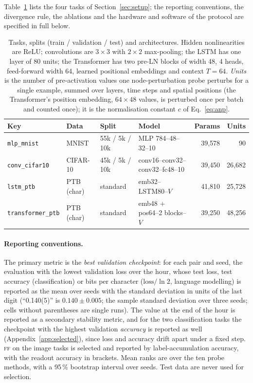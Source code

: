 \documentclass{article}
\newcommand{\method}[1]{\textsc{#1}}
\newcommand{\FF}{\method{ff}}
\begin{document}
Table~\ref{tab:tasks} lists the four tasks of Section~\ref{sec:setup}; the reporting
conventions, the divergence rule, the ablations and the hardware and software of the
protocol are specified in full below.

\begin{table}[t]
  \caption{Tasks, splits (train / validation / test) and architectures. Hidden
  nonlinearities are ReLU; convolutions are $3{\times}3$ with $2{\times}2$ max-pooling;
  the LSTM \citep{hochreiter1997} has one layer of 80 units; the Transformer
  \citep{vaswani2017} has two pre-LN blocks of width 48, 4 heads, feed-forward width 64,
  learned positional embeddings and context $T=64$. \emph{Units} is the number of
  pre-activation values one node-perturbation probe perturbs for a single example,
  summed over layers, time steps and spatial positions (the Transformer's position
  embedding, $64\times48$ values, is perturbed once per batch and counted once); it is
  the normalisation constant $c$ of Eq.~\eqref{eq:anp}.}
  \label{tab:tasks}
  \centering
  \footnotesize
  \setlength{\tabcolsep}{4pt}
  \begin{tabular}{llllrr}
    \toprule
    Key & Data & Split & Model & Params & Units \\
    \midrule
    \texttt{mlp\_mnist}       & MNIST      & 55k / 5k / 10k & MLP 784--48--32--10                 & 39,578 & 90 \\
    \texttt{conv\_cifar10}    & CIFAR-10   & 45k / 5k / 10k & conv16--conv32--conv32--fc48--10    & 39,450 & 26,682 \\
    \texttt{lstm\_ptb}        & PTB (char) & standard       & emb32--LSTM80--$V$                  & 41,810 & 25,728 \\
    \texttt{transformer\_ptb} & PTB (char) & standard       & emb48 $+$ pos64--2 blocks--$V$      & 39,250 & 48,256 \\
    \bottomrule
  \end{tabular}
\end{table}

\paragraph{Reporting conventions.}
The primary metric is the \emph{best validation checkpoint}: for each pair and seed,
the evaluation with the lowest validation loss over the hour, whose test loss, test
accuracy (classification) or bits per character ($\text{loss}/\ln 2$, language
modelling) is reported as the mean over seeds with the standard deviation in units of
the last digit (``0.140(5)'' is $0.140\pm0.005$; the sample standard deviation over
three seeds; cells without parentheses are single runs). The value at the end of the
hour is reported as a secondary stability metric, and for the two classification tasks
the checkpoint with the highest validation \emph{accuracy} is reported as well
(Appendix~\ref{app:selected}), since loss and accuracy drift apart under a fixed step.
\FF{} on the image tasks is selected and reported by label-accumulation accuracy, with
the readout accuracy in brackets. Mean ranks are over the ten probe methods, with a
95\,\% bootstrap interval over seeds. Test data are never used for selection.
\end{document}
